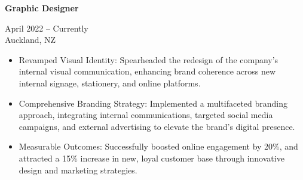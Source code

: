 \documentclass[10pt,a4paper,ragged2e,withhyper]{altacv}
\renewcommand{\cvevent}[4]{%
  \textbf{#1} %
  \hfill %
  \begin{minipage}[t]{.5\linewidth}
    \raggedleft %
    \small#3 %
    \\ %
    #4 %
  \end{minipage}
  \vspace{\baselineskip} %
}
\begin{document}
\vspace{0.5cm}


\begin{paracol}{2}
  \divider
  \divider
  \divider
  \divider
  \divider
  \divider

  
  \switchcolumn
  \divider
  \divider
  \divider
  \divider
  \divider

  \divider

\end{paracol}

\vspace{0.5cm}

\makeatletter
\makeatother


\cvevent{Graphic Designer}{Bonita Brazilian Beauty}{April 2022 -- Currently}{Auckland, NZ}
\begin{itemize}
  \item Revamped Visual Identity: Spearheaded the redesign of the company's internal visual communication, enhancing brand coherence across new internal signage, stationery, and online platforms.
  \item Comprehensive Branding Strategy: Implemented a multifaceted branding approach, integrating internal communications, targeted social media campaigns, and external advertising to elevate the brand's digital presence.
  \item Measurable Outcomes: Successfully boosted online engagement by 20\%, and attracted a 15\% increase in new, loyal customer base through innovative design and marketing strategies.
\end{itemize}
\end{document}
